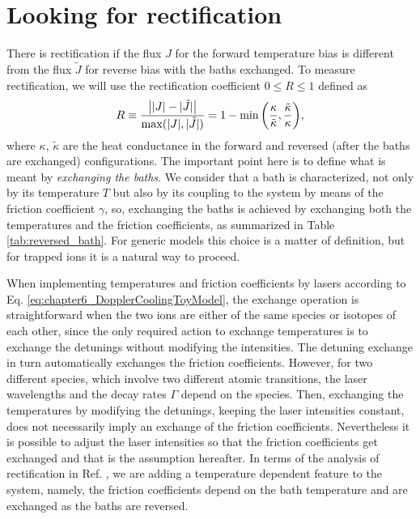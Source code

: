 \section{Looking for rectification\label{sec:lookingForR}}
%
%
%
There is rectification if the flux $J$  for the forward temperature bias is different from the flux $\tilde{J}$ for reverse bias
with the baths exchanged.  To measure rectification, we will use the rectification coefficient $0\le R\le 1$ defined as
%
\begin{equation}
  R \equiv \frac{\abs{|J|-|\tilde{J}|}}{\max(|J|,|\tilde{J}|)}
  = 1 - \min{ \left( \frac{\kappa}{\tilde{\kappa}} , \frac{\tilde{\kappa}}{\kappa} \right) },
  \label{eq:chapter6_Rectification}
\end{equation}
%
where $\kappa$, $\tilde{\kappa}$ are the heat conductance in the forward and reversed (after the baths are exchanged) configurations. The important point here is to define what is meant by \textit{exchanging the baths}. We consider that a bath is characterized, not only by its temperature $T$ but also by its coupling  to the system by means of the friction coefficient $\gamma$, so, exchanging the baths is achieved by exchanging both the temperatures and the friction coefficients, as summarized in Table \ref{tab:reversed_bath}. For generic models this
choice is a matter of definition, but for trapped ions it is a natural way to proceed.

When implementing temperatures and friction coefficients by lasers according to
Eq. \eqref{eq:chapter6_DopplerCoolingToyModel}, the exchange operation is straightforward when the two ions are either of the same species or isotopes of each other, since the only required action to exchange temperatures is to exchange the detunings without modifying the intensities. The detuning exchange in turn automatically exchanges the friction coefficients. However, for two different species, which involve two different atomic transitions, the laser wavelengths and the decay rates $\Gamma$ depend on the species. Then, exchanging the temperatures by modifying the detunings, keeping the laser intensities constant, does not necessarily imply an exchange of the friction coefficients. Nevertheless it is possible to adjust the laser intensities so that the friction coefficients get exchanged and that is the assumption hereafter. In terms of the analysis of rectification in Ref. \cite{Pereira2017}, we are adding a temperature dependent feature to the system, namely,  the friction coefficients depend on the bath temperature
and are exchanged as the baths are reversed.

